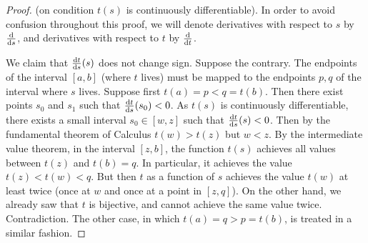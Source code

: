 \documentclass[12pt]{book}
\begin{document}
\begin{proof} (on condition $t(s)$ is continuously differentiable). In order to avoid confusion throughout this proof, we will denote derivatives with respect to $s$ by $\frac{{\normalfont \text{d}}}{{\normalfont \text{d}} s}$, and derivatives with respect to $t$ by $\frac{{\normalfont \text{d}}}{{\normalfont \text{d}} t}$.

We claim that $\frac{{\normalfont \text{d}} t}{{\normalfont \text{d}} s}(s)$ does not change sign. Suppose the contrary. The endpoints of the interval $[a,b]$ (where $t$ lives) must be mapped to the endpoints $p,q$ of the interval where $s$ lives. Suppose first $t(a)=p<q=t(b)$.  Then there exist points $s_0$ and $s_1$ such that  $\frac{{\normalfont \text{d}} t}{{\normalfont \text{d}} s}(s_0)<0$. As $t(s)$ is continuously differentiable, there exists a small interval  $s_0\in [w, z]$ such that $\frac{{\normalfont \text{d}} t}{{\normalfont \text{d}} s}(s)<0$. Then by the fundamental theorem of Calculus $t(w)>t(z)$ but $w<z$. By the intermediate value theorem, in the interval $[z,b]$, the function $t(s)$ achieves all values between $t(z)$ and $t(b)=q$. In particular, it achieves the value $t(z)<t(w)<q$. But then $t$ as a function of $s$ achieves the value $t(w)$ at least twice (once at $w$ and once at a point in $[z,q]$). On the other hand, we already saw that $t$ is bijective, and cannot achieve the same value twice. Contradiction. The other case, in which $t(a)=q>p=t(b)$, is treated in a similar fashion.


\end{proof}
\end{document}
